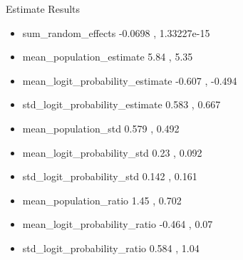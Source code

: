 \documentclass{beamer}
\begin{document}
\begin{frame}{Estimate Results}
\begin{itemize}

\item
sum\_random\_effects
\hspace{4.9em} -0.0698 , 1.33227e-15
\pause

\item
mean\_population\_estimate
\hspace{2.5em} 5.84 , 5.35
\pause

\item
mean\_logit\_probability\_estimate
\hspace{0.0em} -0.607 , -0.494
\pause

\item
std\_logit\_probability\_estimate
\hspace{1.3em} 0.583 , 0.667
\pause

\item
mean\_population\_std
\hspace{4.7em} 0.579 , 0.492
\pause

\item
mean\_logit\_probability\_std
\hspace{2.5em} 0.23 , 0.092
\pause

\item
std\_logit\_probability\_std
\hspace{3.5em} 0.142 , 0.161
\pause

\item
mean\_population\_ratio
\hspace{3.7em} 1.45 , 0.702
\pause

\item
mean\_logit\_probability\_ratio
\hspace{1.5em} -0.464 , 0.07
\pause

\item
std\_logit\_probability\_ratio
\hspace{2.5em} 0.584 , 1.04
\pause


\end{itemize}
\end{frame}
\end{document}
